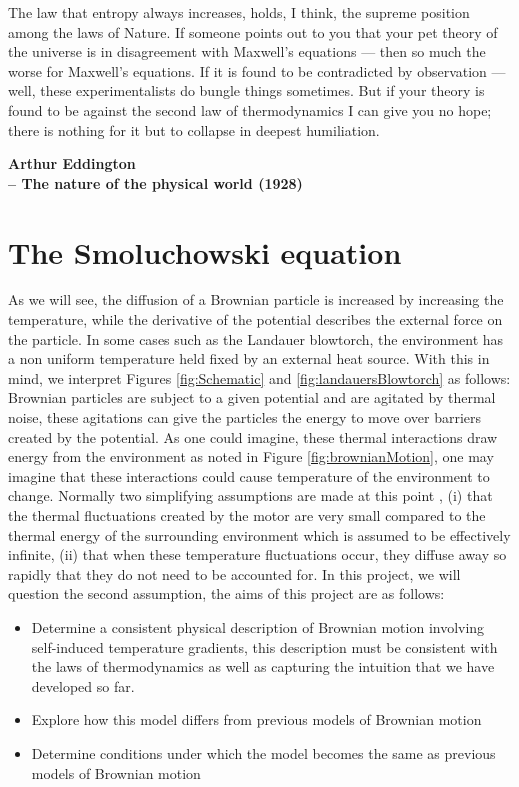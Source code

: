 \epigraph{The law that entropy always increases, holds, I think, the supreme position among the laws of Nature. If someone points out to you that your pet theory of the universe is in disagreement with Maxwell's equations — then so much the worse for Maxwell's equations. If it is found to be contradicted by observation — well, these experimentalists do bungle things sometimes. But if your theory is found to be against the second law of thermodynamics I can give you no hope; there is nothing for it but to collapse in deepest humiliation.}{\textbf{Arthur Eddington \\ -- The nature of the physical world (1928)}}


\section{The Smoluchowski equation} \label{Smoluchowski}

As we will see, the diffusion of a Brownian particle is increased by increasing the temperature, while the derivative of the potential describes the external force on the particle. In some cases such as the Landauer blowtorch, the environment has a non uniform temperature held fixed by an external heat source. With this in mind, we interpret Figures \ref{fig:Schematic} and \ref{fig:landauersBlowtorch} as follows: Brownian particles are subject to a given potential and are agitated by thermal noise, these agitations can give the particles the energy to move over barriers created by the potential. As one could imagine, these thermal interactions draw energy from the environment as noted in Figure \ref{fig:brownianMotion}, one may imagine that these interactions could cause temperature of the environment to change. Normally two simplifying assumptions are made at this point \cite{Reimann2001}, (i) that the thermal fluctuations created by the motor are very small compared to the thermal energy of the surrounding environment which is assumed to be effectively infinite, (ii) that when these temperature fluctuations occur, they diffuse away so rapidly that they do not need to be accounted for. In this project, we will question the second assumption, the aims of this project are as follows:
\begin{itemize}
\item{Determine a consistent physical description of Brownian motion involving self-induced temperature gradients, this description must be consistent with the laws of thermodynamics as well as capturing the intuition that we have developed so far.}
\item{Explore how this model differs from previous models of Brownian motion}
\item{Determine conditions under which the model becomes the same as previous models of Brownian motion}
\end{itemize}

